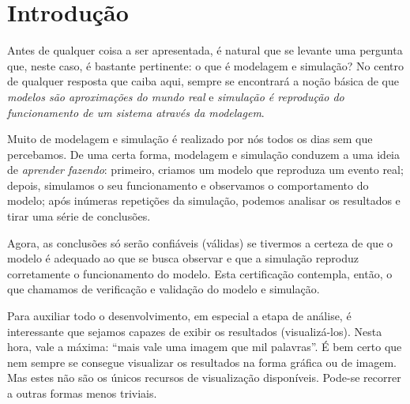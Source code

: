 \documentclass[a4paper,12pt,oneside,onecolumn]{uerj/uerj}
\begin{document}




\sumario


\mainmatter

\chapter*{Introdução}

Antes de qualquer coisa a ser apresentada, é natural que se levante uma pergunta que, neste caso, é bastante pertinente: o que é modelagem e simulação? No centro de qualquer resposta que caiba aqui, sempre se encontrará a noção básica de que \emph{modelos são aproximações do mundo real} e \emph{simulação é reprodução do funcionamento de um sistema através da modelagem}.

Muito de modelagem e simulação é realizado por nós todos os dias sem que percebamos. De uma certa forma, modelagem e simulação conduzem a uma ideia de \emph{aprender fazendo}: primeiro, criamos um modelo que reproduza um evento real; depois, simulamos o seu funcionamento e observamos o comportamento do modelo; após inúmeras repetições da simulação, podemos analisar os resultados e tirar uma série de conclusões.

Agora, as conclusões só serão confiáveis (válidas) se tivermos a certeza de que o modelo é adequado ao que se busca observar e que a simulação reproduz corretamente o funcionamento do modelo. Esta certificação contempla, então, o que chamamos de verificação e validação do modelo e simulação.

Para auxiliar todo o desenvolvimento, em especial a etapa de análise, é interessante que sejamos capazes de exibir os resultados (visualizá-los). Nesta hora, vale a máxima: ``mais vale uma imagem que mil palavras''. É bem certo que nem sempre se consegue visualizar os resultados na forma gráfica ou de imagem. Mas estes não são os únicos recursos de visualização disponíveis. Pode-se recorrer a outras formas menos triviais.
\end{document}
